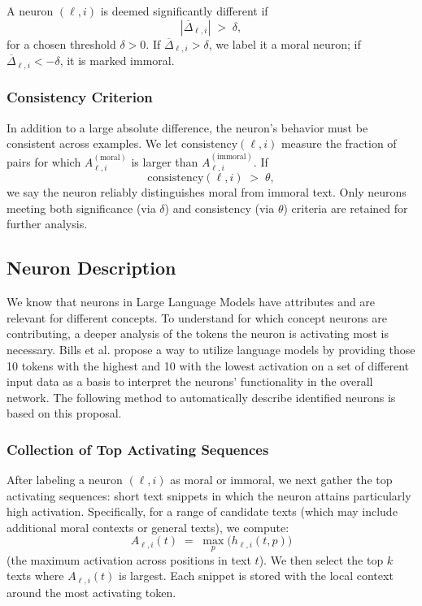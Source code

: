 \documentclass[runninghheads]{llncs}
\begin{document}
A neuron \((\ell, i)\) is deemed significantly different if 
\[
|\overline{\Delta}_{\ell, i}| \;>\;\delta,
\]
for a chosen threshold \(\delta>0\). If \(\overline{\Delta}_{\ell, i} > \delta\), we label it a moral neuron; if \(\overline{\Delta}_{\ell, i} < -\delta\), it is marked immoral.  

\subsubsection{Consistency Criterion}
In addition to a large absolute difference, the neuron’s behavior must be consistent across examples. We let \(\mathrm{consistency}(\ell, i)\) measure the fraction of pairs for which \(A^{(\mathrm{moral})}_{\ell, i}\) is larger than \(A^{(\mathrm{immoral})}_{\ell, i}\). If 
\[
\mathrm{consistency}(\ell, i) \;>\; \theta,
\]
we say the neuron reliably distinguishes moral from immoral text. Only neurons meeting both significance (via \(\delta\)) and consistency (via \(\theta\)) criteria are retained for further analysis.  

\subsection{Neuron Description}

We know that neurons in Large Language Models have attributes and are relevant for different concepts. To understand for which concept neurons are contributing, a deeper analysis of the tokens the neuron is activating most is necessary. Bills et al. propose a way to utilize language models by providing those 10 tokens with the highest and 10 with the lowest activation on a set of different input data as a basis to interpret the neurons' functionality in the overall network.\cite{bills2023language} The following method to automatically describe identified neurons is based on this proposal. 

\subsubsection{Collection of Top Activating Sequences}

After labeling a neuron \((\ell, i)\) as moral or immoral, we next gather the top activating sequences: short text snippets in which the neuron attains particularly high activation. Specifically, for a range of candidate texts (which may include additional moral contexts or general texts), we compute:
\[
A_{\ell, i}(t) \;=\; \max_{p} \bigl(h_{\ell,i}(t,p)\bigr)
\]
(the maximum activation across positions in text \(t\)). We then select the top \(k\) texts where \(A_{\ell, i}(t)\) is largest. Each snippet is stored with the local context around the most activating token.
\end{document}
